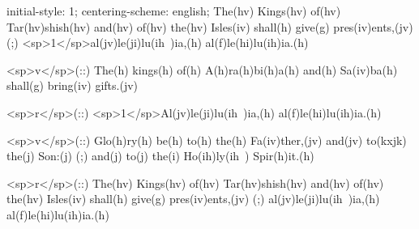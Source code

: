 initial-style: 1;
centering-scheme: english;
The(hv) Kings(hv) of(hv) Tar(hv)shish(hv) and(hv) of(hv) the(hv) Isles(iv) shall(h) give(g) pres(iv)ents,(jv) (;) <sp>1</sp>al(jv)le(ji)lu(ih~)ia,(h) al(f)le(hi)lu(ih)ia.(h)

<sp>v</sp>(::) The(h) kings(h) of(h) A(h)ra(h)bi(h)a(h) and(h) Sa(iv)ba(h) shall(g) bring(iv) gifts.(jv)

<sp>r</sp>(::) <sp>1</sp>Al(jv)le(ji)lu(ih~)ia,(h) al(f)le(hi)lu(ih)ia.(h)

<sp>v</sp>(::) Glo(h)ry(h) be(h) to(h) the(h) Fa(iv)ther,(jv) and(jv) to(kxjk) the(j) Son:(j) (;) and(j) to(j) the(i) Ho(ih)ly(ih~) Spir(h)it.(h)

<sp>r</sp>(::) The(hv) Kings(hv) of(hv) Tar(hv)shish(hv) and(hv) of(hv) the(hv) Isles(iv) shall(h) give(g) pres(iv)ents,(jv) (;) al(jv)le(ji)lu(ih~)ia,(h) al(f)le(hi)lu(ih)ia.(h)